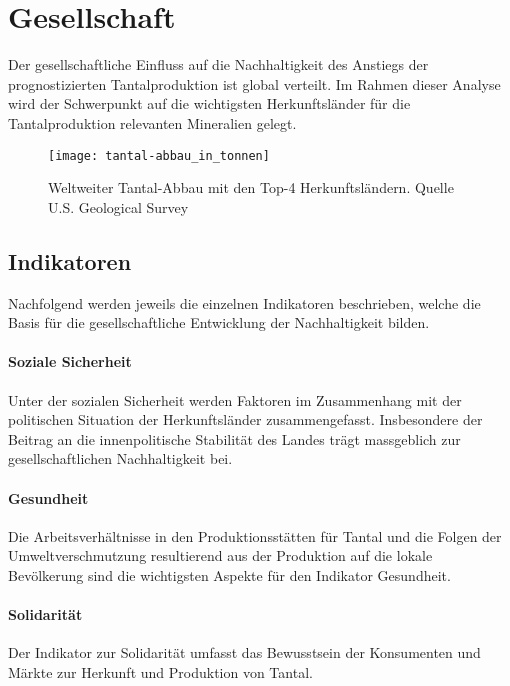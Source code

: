 \section{Gesellschaft}\label{sec:society}

Der gesellschaftliche Einfluss auf die Nachhaltigkeit des Anstiegs der
prognostizierten Tantalproduktion ist global verteilt. Im Rahmen dieser Analyse
wird der Schwerpunkt auf die wichtigsten Herkunftsländer für die
Tantalproduktion relevanten Mineralien gelegt.

\begin{figure}[h]
    \centering
    \texttt{[image: tantal-abbau\_in\_tonnen]}
    \caption{Weltweiter Tantal-Abbau mit den Top-4 Herkunftsländern. Quelle U.S. Geological Survey ~\cite{USGSMine8}}
    \label{}
\end{figure}

\subsection{Indikatoren}

Nachfolgend werden jeweils die einzelnen Indikatoren beschrieben, welche die
Basis für die gesellschaftliche Entwicklung der Nachhaltigkeit bilden.

\paragraph{Soziale Sicherheit}

Unter der sozialen Sicherheit werden Faktoren im Zusammenhang mit der
politischen Situation der Herkunftsländer zusammengefasst. Insbesondere der
Beitrag an die innenpolitische Stabilität des Landes trägt massgeblich zur
gesellschaftlichen Nachhaltigkeit bei.

\paragraph{Gesundheit}

Die Arbeitsverhältnisse in den Produktionsstätten für Tantal und die Folgen
der Umweltverschmutzung resultierend aus der Produktion auf die lokale
Bevölkerung sind die wichtigsten Aspekte für den Indikator Gesundheit.

\paragraph{Solidarität}

Der Indikator zur Solidarität umfasst das Bewusstsein der Konsumenten und
Märkte zur Herkunft und Produktion von Tantal.

